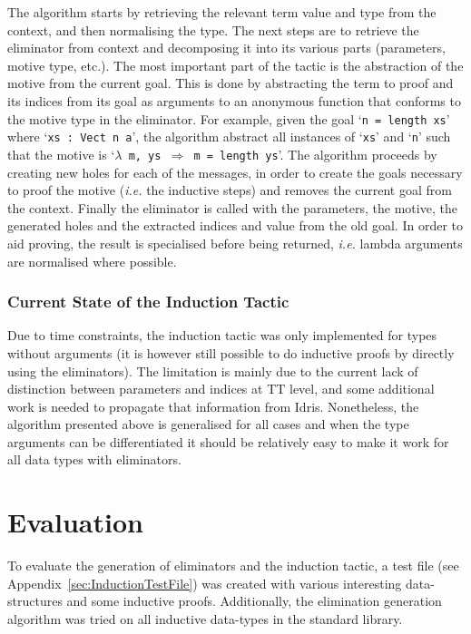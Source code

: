 \documentclass[a4paper]{article}%
\begin{document}
The algorithm starts by retrieving the relevant term value and type from the context, and then normalising the type. The next steps are to retrieve the eliminator from context and decomposing it into its various parts
(parameters, motive type, etc.). The most important part of the tactic is the abstraction of the motive from the current goal. This is done by abstracting the term to proof and its indices from its goal as arguments to an anonymous function that conforms to the motive type in the eliminator. For example, given the goal `\texttt{n = length xs}' where `\texttt{xs : Vect n a}', the algorithm abstract all instances of `\texttt{xs}' and `\texttt{n}' such that
the motive is `\texttt{$\lambda$ m, ys $\Rightarrow$ m = length ys}'.
The algorithm proceeds by creating new holes for each of the messages, in order to create the goals necessary to proof the motive (\textit{i.e.} the inductive steps) and removes the current goal from the context.
Finally the eliminator is called with the parameters, the motive, the generated holes and the extracted indices and value from the old goal. In order to aid proving, the result is specialised before being returned, \textit{i.e.} lambda arguments are normalised
where possible.

\subsubsection{Current State of the Induction Tactic}
\label{ssub:CurrentStateoftheInductionTactic}
Due to time constraints, the induction tactic was only implemented for types without arguments (it is however still possible to do inductive proofs by directly using the eliminators).
The limitation is mainly due to the current lack of distinction between parameters and indices at TT level, and some additional work is needed to propagate that information from Idris.
Nonetheless, the algorithm presented above is generalised for all cases and when the type arguments can be differentiated it should be relatively easy to make it work for all data types with eliminators.

\section{Evaluation}
\label{sec:Evaluation}
To evaluate the generation of eliminators and the induction tactic, a test file (see Appendix~\ref{sec:InductionTestFile}) was created with various interesting data-structures and some inductive proofs.
Additionally, the elimination generation algorithm was tried on all inductive data-types in the standard library.
\end{document}
